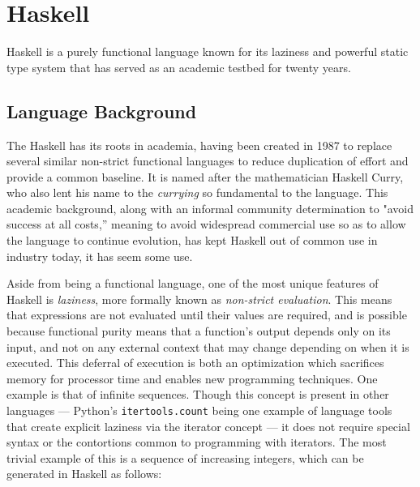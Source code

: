 \documentclass{article}
\begin{document}


\section{Haskell}

Haskell is a purely functional language known for its laziness and powerful static type system that has served as an academic testbed for twenty years.

\subsection{Language Background}

The Haskell has its roots in academia, having been created in 1987 to replace several similar non-strict functional languages to reduce duplication of effort and provide a common baseline\cite{hudak2007history}.
It is named after the mathematician Haskell Curry, who also lent his name to the \textit{currying} so fundamental to the language.
This academic background, along with an informal community determination to	"avoid success at all costs,'' meaning to avoid widespread commercial use so as to allow the language to continue evolution, has kept Haskell out of common use in industry today, it has seem some use\cite{haskellinindustry}.

Aside from being a functional language, one of the most unique features of Haskell is \textit{laziness}, more formally known as \textit{non-strict evaluation}.
This means that expressions are not evaluated until their values are required, and is possible because functional purity means that a function's output depends only on its input, and not on any external context that may change depending on when it is executed.
This deferral of execution is both an optimization which sacrifices memory for processor time and enables new programming techniques.
One example is that of infinite sequences.
Though this concept is present in other languages --- Python's \verb!itertools.count! being one example of language tools that create explicit laziness via the iterator concept\cite{pythonitertools} --- it does not require special syntax or the contortions common to programming with iterators.
The most trivial example of this is a sequence of increasing integers, which can be generated in Haskell as follows:
\end{document}
